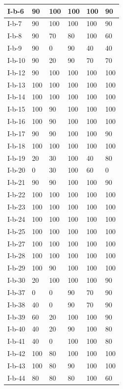 \documentclass[11pt,a4paper]{article}
\begin{document}
\begin{table}[h]
\begin{tabular}{|l|l|l|l|l|l|}
I-b-6 & 90 & 100 & 100 & 100 & 90 \\ \hline
I-b-7 & 90 & 100 & 100 & 100 & 90 \\ \hline
I-b-8 & 90 & 70 & 80 & 100 & 60 \\ \hline
I-b-9 & 90 & 0 & 90 & 40 & 40 \\ \hline
I-b-10 & 90 & 20 & 90 & 70 & 70 \\ \hline
I-b-12 & 90 & 100 & 100 & 100 & 100 \\ \hline
I-b-13 & 100 & 100 & 100 & 100 & 100 \\ \hline
I-b-14 & 100 & 100 & 100 & 100 & 100 \\ \hline
I-b-15 & 100 & 90 & 100 & 100 & 100 \\ \hline
I-b-16 & 100 & 90 & 100 & 100 & 100 \\ \hline
I-b-17 & 90 & 90 & 100 & 100 & 90 \\ \hline
I-b-18 & 100 & 100 & 100 & 100 & 100 \\ \hline
I-b-19 & 20 & 30 & 100 & 40 & 80 \\ \hline
I-b-20 & 0 & 30 & 100 & 60 & 0 \\ \hline
I-b-21 & 90 & 90 & 100 & 100 & 90 \\ \hline
I-b-22 & 100 & 100 & 100 & 100 & 100 \\ \hline
I-b-23 & 100 & 100 & 100 & 100 & 100 \\ \hline
I-b-24 & 100 & 100 & 100 & 100 & 100 \\ \hline
I-b-25 & 100 & 100 & 100 & 100 & 100 \\ \hline
I-b-27 & 100 & 100 & 100 & 100 & 100 \\ \hline
I-b-28 & 100 & 100 & 100 & 100 & 100 \\ \hline
I-b-29 & 100 & 90 & 100 & 100 & 100 \\ \hline
I-b-30 & 20 & 100 & 100 & 100 & 90 \\ \hline
I-b-37 & 0 & 0 & 90 & 70 & 90 \\ \hline
I-b-38 & 40 & 0 & 90 & 70 & 90 \\ \hline
I-b-39 & 60 & 20 & 100 & 100 & 90 \\ \hline
I-b-40 & 40 & 20 & 90 & 100 & 80 \\ \hline
I-b-41 & 40 & 0 & 100 & 100 & 80 \\ \hline
I-b-42 & 100 & 80 & 100 & 100 & 100 \\ \hline
I-b-43 & 100 & 80 & 90 & 100 & 100 \\ \hline
I-b-44 & 80 & 80 & 80 & 100 & 60 \\ \hline

\end{tabular}
\end{table}
\end{document}

